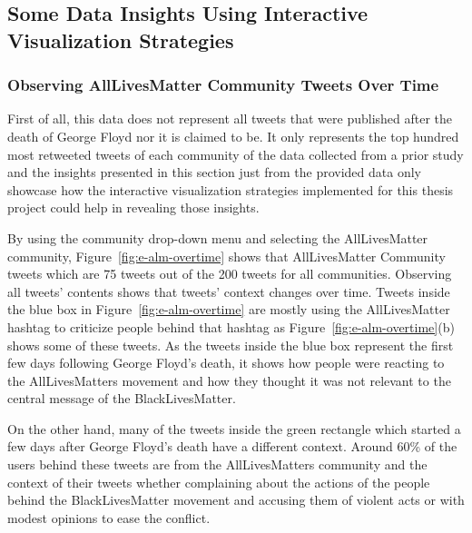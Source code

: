 


\subsection{Some Data Insights Using Interactive Visualization Strategies}

\subsubsection{Observing AllLivesMatter Community Tweets Over Time}

First of all, this data does not represent all tweets that were published after the death of George Floyd nor it is claimed to be. It only represents the top hundred most retweeted tweets of each community of the data collected from a prior study and the insights presented in this section just from the provided data only showcase how the interactive visualization strategies implemented for this thesis project could help in revealing those insights. 


By using the community drop-down menu and selecting the AllLivesMatter community, Figure~\ref{fig:e-alm-overtime} shows that AllLivesMatter Community tweets which are 75 tweets out of the 200 tweets for all communities. Observing all tweets' contents shows that tweets' context changes over time. Tweets inside the blue box in Figure~\ref{fig:e-alm-overtime} are mostly using the AllLivesMatter hashtag to criticize people behind that hashtag as Figure~\ref{fig:e-alm-overtime}(b) shows some of these tweets. As the tweets inside the blue box represent the first few days following George Floyd's death, it shows how people were reacting to the AllLivesMatters movement and how they thought it was not relevant to the central message of the BlackLivesMatter. 


On the other hand, many of the tweets inside the green rectangle which started a few days after George Floyd's death have a different context. Around 60\% of the users behind these tweets are from the AllLivesMatters community and the context of their tweets whether complaining about the actions of the people behind the BlackLivesMatter movement and accusing them of violent acts or with modest opinions to ease the conflict. 


